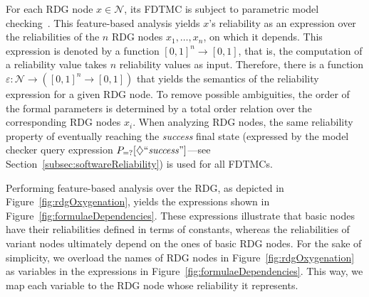For each RDG node $x \in \mathcal{N}$, its FDTMC is subject to  parametric model
checking~\cite{Hahn_param_2010,Filieri_pmctool_2012}. This feature-based
analysis yields $x$'s reliability as an expression over the reliabilities of the
$n$ RDG nodes $x_1, \dotsc, x_n$, on which it depends.  This expression is
denoted by a function $[0,1]^n \to [0,1]$, that is, the computation of a
reliability value takes $n$ reliability values as input. Therefore, there is a
function $\varepsilon: \mathcal{N} \to ([0,1]^n \to [0,1])$ that yields the
semantics of the reliability expression for a given RDG node.  To remove
possible ambiguities, the order of the formal parameters is determined by a
total order relation over the corresponding RDG nodes $x_i$.  When analyzing RDG
nodes, the same reliability property of eventually reaching the \emph{success}
final state (expressed by the model checker query expression
$P_{=?}[\diamondsuit \mathit{``success"}]$---see
Section~\ref{subsec:softwareReliability}) is used for all FDTMCs.

Performing feature-based analysis over the RDG, as depicted in
Figure~\ref{fig:rdgOxygenation}, yields the expressions shown in
Figure~\ref{fig:formulaeDependencies}.
These expressions illustrate that basic nodes have their reliabilities defined
in terms of constants, whereas the reliabilities of variant nodes ultimately
depend on the ones of basic RDG nodes.  For the sake of simplicity, we overload
the names of RDG nodes in Figure~\ref{fig:rdgOxygenation} as variables in the
expressions in Figure~\ref{fig:formulaeDependencies}.  This way, we map each
variable to the RDG node whose reliability it represents.

